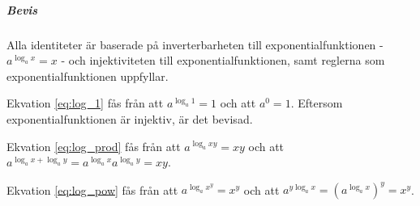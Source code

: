 \subparagraph{Bevis}

Alla identiteter är baserade på inverterbarheten till exponentialfunktionen - $a^{\log_a x} = x$ - och injektiviteten till exponentialfunktionen, samt reglerna som exponentialfunktionen uppfyllar.

Ekvation \ref{eq:log_1} fås från att $a^{\log_a 1} = 1$ och att $a^0 = 1$. Eftersom exponentialfunktionen är injektiv, är det bevisad.

Ekvation \ref{eq:log_prod} fås från att $a^{\log_a xy} = xy$ och att $a^{\log_a x + \log_a y} = a^{\log_a x}a^{\log_a y}=xy$.

Ekvation \ref{eq:log_pow} fås från att $a^{\log_a x^y} = x^y$ och att $a^{y\log_a x} = \left(a^{\log_a x}\right)^y = x^y$.